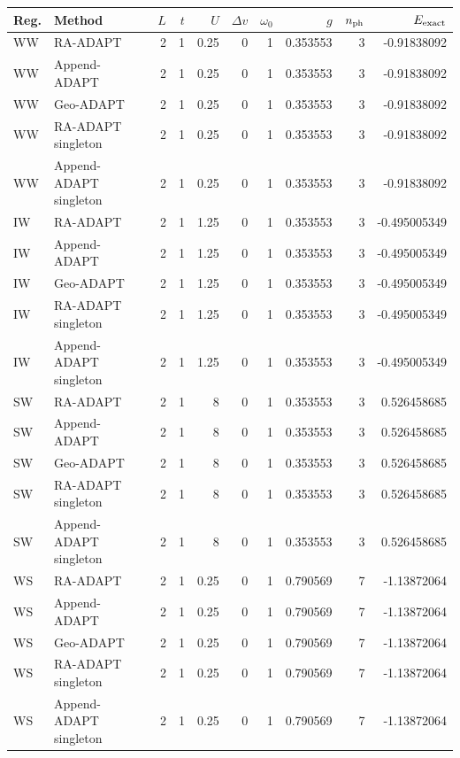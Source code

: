 \documentclass[10pt,letterpaper]{article}
\begin{document}
\vspace{4pt}
\scriptsize
\setlength{\tabcolsep}{2.6pt}
\begin{longtable}{@{}llrrrrrrrr@{}}
\toprule
Reg. & Method & $L$ & $t$ & $U$ & $\Delta v$ & $\omega_0$ & $g$
& $n_{\rm ph}$ & $E_{\rm exact}$ \\
\midrule
WW & RA-ADAPT & 2 & 1 & 0.25 & 0 & 1 & 0.353553 & 3 & -0.91838092 \\
WW & Append-ADAPT & 2 & 1 & 0.25 & 0 & 1 & 0.353553 & 3 & -0.91838092 \\
WW & Geo-ADAPT & 2 & 1 & 0.25 & 0 & 1 & 0.353553 & 3 & -0.91838092 \\
WW & RA-ADAPT singleton & 2 & 1 & 0.25 & 0 & 1 & 0.353553 & 3 & -0.91838092 \\
WW & Append-ADAPT singleton & 2 & 1 & 0.25 & 0 & 1 & 0.353553 & 3 & -0.91838092 \\
IW & RA-ADAPT & 2 & 1 & 1.25 & 0 & 1 & 0.353553 & 3 & -0.495005349 \\
IW & Append-ADAPT & 2 & 1 & 1.25 & 0 & 1 & 0.353553 & 3 & -0.495005349 \\
IW & Geo-ADAPT & 2 & 1 & 1.25 & 0 & 1 & 0.353553 & 3 & -0.495005349 \\
IW & RA-ADAPT singleton & 2 & 1 & 1.25 & 0 & 1 & 0.353553 & 3 & -0.495005349 \\
IW & Append-ADAPT singleton & 2 & 1 & 1.25 & 0 & 1 & 0.353553 & 3 & -0.495005349 \\
SW & RA-ADAPT & 2 & 1 & 8 & 0 & 1 & 0.353553 & 3 & 0.526458685 \\
SW & Append-ADAPT & 2 & 1 & 8 & 0 & 1 & 0.353553 & 3 & 0.526458685 \\
SW & Geo-ADAPT & 2 & 1 & 8 & 0 & 1 & 0.353553 & 3 & 0.526458685 \\
SW & RA-ADAPT singleton & 2 & 1 & 8 & 0 & 1 & 0.353553 & 3 & 0.526458685 \\
SW & Append-ADAPT singleton & 2 & 1 & 8 & 0 & 1 & 0.353553 & 3 & 0.526458685 \\
WS & RA-ADAPT & 2 & 1 & 0.25 & 0 & 1 & 0.790569 & 7 & -1.13872064 \\
WS & Append-ADAPT & 2 & 1 & 0.25 & 0 & 1 & 0.790569 & 7 & -1.13872064 \\
WS & Geo-ADAPT & 2 & 1 & 0.25 & 0 & 1 & 0.790569 & 7 & -1.13872064 \\
WS & RA-ADAPT singleton & 2 & 1 & 0.25 & 0 & 1 & 0.790569 & 7 & -1.13872064 \\
WS & Append-ADAPT singleton & 2 & 1 & 0.25 & 0 & 1 & 0.790569 & 7 & -1.13872064 \\

\end{longtable}
\end{document}
